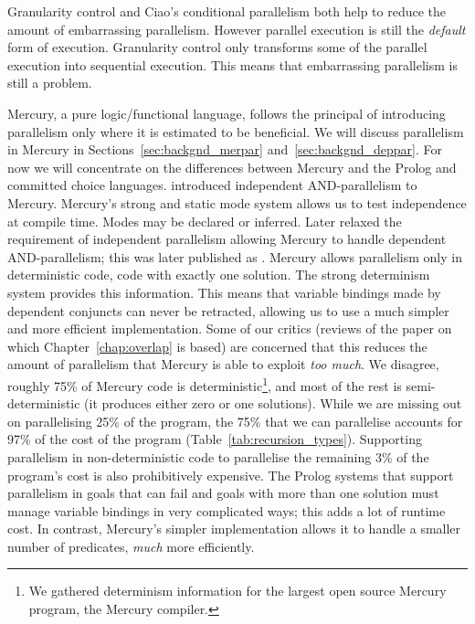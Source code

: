 Granularity control and Ciao's conditional parallelism both help to
reduce the amount of embarrassing parallelism.
However parallel execution is still the \emph{default}
form of execution.
Granularity control only transforms some of the parallel execution into
sequential execution.
This means that embarrassing parallelism is still a problem.

Mercury,
a pure logic/functional language,
follows the principal of introducing parallelism only where it is
estimated to be beneficial.
We will discuss parallelism in Mercury in
Sections~\ref{sec:backgnd_merpar} and~\ref{sec:backgnd_deppar}.
For now we will concentrate on the differences between Mercury
and the Prolog and committed choice languages.
\citet*{conway:2002:par} introduced independent AND-parallelism
to Mercury.
Mercury's strong and static mode system allows us to test independence at
compile time.
Modes may be declared or inferred.
Later \citet*{wang:2006:hons} relaxed the requirement of independent
parallelism allowing Mercury to handle dependent AND-parallelism;
this was later published as \citet*{wang:2011:dep-par}.
Mercury allows parallelism only in deterministic code,
code with exactly one solution.
The strong determinism system provides this information.
This means that variable bindings made by dependent conjuncts can never be
retracted,
allowing us to use a much simpler and more efficient implementation.
Some of our critics (reviews of the paper \citet{bone:2011:overlap}
on which Chapter~\ref{chap:overlap} is based)
are concerned that this reduces the amount of parallelism that Mercury is
able to exploit \emph{too much}.
We disagree,
roughly 75\% of Mercury code is deterministic\footnote{
    We gathered determinism information for the
    largest open source Mercury program, the Mercury compiler.
}, and most of the rest is semi-deterministic
(it produces either zero or one solutions).
While we are missing out on parallelising 25\% of the
program,
the 75\% that we can parallelise accounts for 97\% of the cost of the
program (Table~\ref{tab:recursion_types}).
Supporting parallelism in non-deterministic code to parallelise the
remaining 3\% of the program's cost is also prohibitively expensive.
The Prolog systems that support parallelism in goals that can fail and
goals with more than one solution must manage variable bindings
in very complicated ways;
this adds a lot of runtime cost.
In contrast, Mercury's simpler implementation allows it to handle a
smaller number of predicates, \emph{much} more efficiently.

